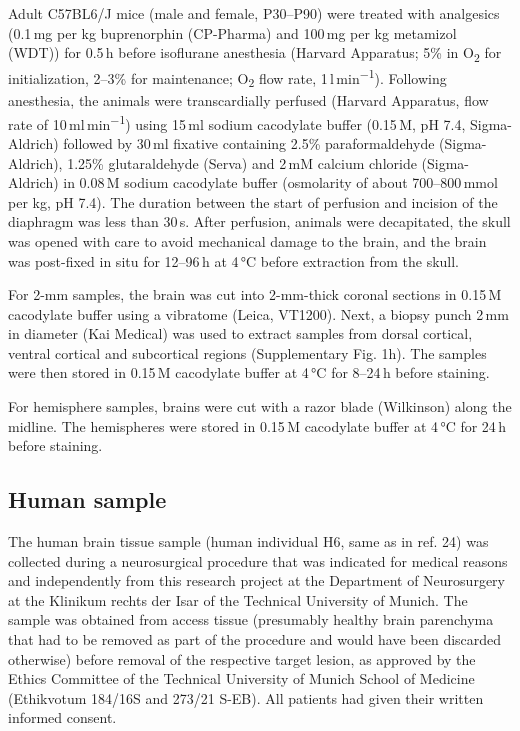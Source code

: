 \documentclass{article}
\begin{document}
Adult C57BL6/J mice (male and female, P30–P90) were treated with analgesics (0.1\,mg per kg buprenorphin (CP-Pharma) and 100\,mg per kg metamizol (WDT)) for 0.5\,h before isoflurane anesthesia (Harvard Apparatus; 5\% in O\textsubscript{2} for initialization, 2–3\% for maintenance; O\textsubscript{2} flow rate, 1\,l\,min\textsuperscript{−1}). Following anesthesia, the animals were transcardially perfused (Harvard Apparatus, flow rate of 10\,ml\,min\textsuperscript{−1}) using 15\,ml sodium cacodylate buffer (0.15\,M, pH 7.4, Sigma-Aldrich) followed by 30\,ml fixative containing 2.5\% paraformaldehyde (Sigma-Aldrich), 1.25\% glutaraldehyde (Serva) and 2\,mM calcium chloride (Sigma-Aldrich) in 0.08\,M sodium cacodylate buffer (osmolarity of about 700–800\,mmol per kg, pH 7.4). The duration between the start of perfusion and incision of the diaphragm was less than 30\,s. After perfusion, animals were decapitated, the skull was opened with care to avoid mechanical damage to the brain, and the brain was post-fixed in situ for 12–96\,h at 4\,°C before extraction from the skull.

For 2-mm samples, the brain was cut into 2-mm-thick coronal sections in 0.15\,M cacodylate buffer using a vibratome (Leica, VT1200). Next, a biopsy punch 2\,mm in diameter (Kai Medical) was used to extract samples from dorsal cortical, ventral cortical and subcortical regions (Supplementary Fig. 1h). The samples were then stored in 0.15\,M cacodylate buffer at 4\,°C for 8–24\,h before staining.

For hemisphere samples, brains were cut with a razor blade (Wilkinson) along the midline. The hemispheres were stored in 0.15\,M cacodylate buffer at 4\,°C for 24\,h before staining.

\subsection*{Human sample}
The human brain tissue sample (human individual H6, same as in ref. 24) was collected during a neurosurgical procedure that was indicated for medical reasons and independently from this research project at the Department of Neurosurgery at the Klinikum rechts der Isar of the Technical University of Munich. The sample was obtained from access tissue (presumably healthy brain parenchyma that had to be removed as part of the procedure and would have been discarded otherwise) before removal of the respective target lesion, as approved by the Ethics Committee of the Technical University of Munich School of Medicine (Ethikvotum 184/16S and 273/21 S-EB). All patients had given their written informed consent.
\end{document}
